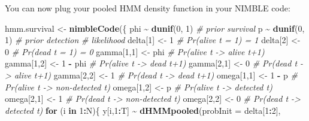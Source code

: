 \documentclass[
  12pt,
]{krantz}
\newenvironment{Shaded}{\begin{snugshade}}{\end{snugshade}}
\newcommand{\AttributeTok}[1]{\textcolor[rgb]{0.13,0.29,0.53}{#1}}
\newcommand{\CommentTok}[1]{\textcolor[rgb]{0.56,0.35,0.01}{\textit{#1}}}
\newcommand{\ControlFlowTok}[1]{\textcolor[rgb]{0.13,0.29,0.53}{\textbf{#1}}}
\newcommand{\DecValTok}[1]{\textcolor[rgb]{0.00,0.00,0.81}{#1}}
\newcommand{\FunctionTok}[1]{\textcolor[rgb]{0.13,0.29,0.53}{\textbf{#1}}}
\newcommand{\NormalTok}[1]{#1}
\newcommand{\OtherTok}[1]{\textcolor[rgb]{0.56,0.35,0.01}{#1}}
\newcommand{\SpecialCharTok}[1]{\textcolor[rgb]{0.81,0.36,0.00}{\textbf{#1}}}
\begin{document}
You can now plug your pooled HMM density function in your NIMBLE code:

\begin{Shaded}
\begin{Highlighting}[]
\NormalTok{hmm.survival }\OtherTok{\textless{}{-}} \FunctionTok{nimbleCode}\NormalTok{(\{}
\NormalTok{  phi }\SpecialCharTok{\textasciitilde{}} \FunctionTok{dunif}\NormalTok{(}\DecValTok{0}\NormalTok{, }\DecValTok{1}\NormalTok{) }\CommentTok{\# prior survival}
\NormalTok{  p }\SpecialCharTok{\textasciitilde{}} \FunctionTok{dunif}\NormalTok{(}\DecValTok{0}\NormalTok{, }\DecValTok{1}\NormalTok{) }\CommentTok{\# prior detection}
  \CommentTok{\# likelihood}
\NormalTok{  delta[}\DecValTok{1}\NormalTok{] }\OtherTok{\textless{}{-}} \DecValTok{1}          \CommentTok{\# Pr(alive t = 1) = 1}
\NormalTok{  delta[}\DecValTok{2}\NormalTok{] }\OtherTok{\textless{}{-}} \DecValTok{0}          \CommentTok{\# Pr(dead t = 1) = 0}
\NormalTok{  gamma[}\DecValTok{1}\NormalTok{,}\DecValTok{1}\NormalTok{] }\OtherTok{\textless{}{-}}\NormalTok{ phi      }\CommentTok{\# Pr(alive t {-}\textgreater{} alive t+1)}
\NormalTok{  gamma[}\DecValTok{1}\NormalTok{,}\DecValTok{2}\NormalTok{] }\OtherTok{\textless{}{-}} \DecValTok{1} \SpecialCharTok{{-}}\NormalTok{ phi  }\CommentTok{\# Pr(alive t {-}\textgreater{} dead t+1)}
\NormalTok{  gamma[}\DecValTok{2}\NormalTok{,}\DecValTok{1}\NormalTok{] }\OtherTok{\textless{}{-}} \DecValTok{0}        \CommentTok{\# Pr(dead t {-}\textgreater{} alive t+1)}
\NormalTok{  gamma[}\DecValTok{2}\NormalTok{,}\DecValTok{2}\NormalTok{] }\OtherTok{\textless{}{-}} \DecValTok{1}        \CommentTok{\# Pr(dead t {-}\textgreater{} dead t+1)}
\NormalTok{  omega[}\DecValTok{1}\NormalTok{,}\DecValTok{1}\NormalTok{] }\OtherTok{\textless{}{-}} \DecValTok{1} \SpecialCharTok{{-}}\NormalTok{ p    }\CommentTok{\# Pr(alive t {-}\textgreater{} non{-}detected t)}
\NormalTok{  omega[}\DecValTok{1}\NormalTok{,}\DecValTok{2}\NormalTok{] }\OtherTok{\textless{}{-}}\NormalTok{ p        }\CommentTok{\# Pr(alive t {-}\textgreater{} detected t)}
\NormalTok{  omega[}\DecValTok{2}\NormalTok{,}\DecValTok{1}\NormalTok{] }\OtherTok{\textless{}{-}} \DecValTok{1}        \CommentTok{\# Pr(dead t {-}\textgreater{} non{-}detected t)}
\NormalTok{  omega[}\DecValTok{2}\NormalTok{,}\DecValTok{2}\NormalTok{] }\OtherTok{\textless{}{-}} \DecValTok{0}        \CommentTok{\# Pr(dead t {-}\textgreater{} detected t)}
  \ControlFlowTok{for}\NormalTok{ (i }\ControlFlowTok{in} \DecValTok{1}\SpecialCharTok{:}\NormalTok{N)\{}
\NormalTok{    y[i,}\DecValTok{1}\SpecialCharTok{:}\NormalTok{T] }\SpecialCharTok{\textasciitilde{}} \FunctionTok{dHMMpooled}\NormalTok{(}\AttributeTok{probInit =}\NormalTok{ delta[}\DecValTok{1}\SpecialCharTok{:}\DecValTok{2}\NormalTok{], }

\end{Highlighting}
\end{Shaded}
\end{document}
